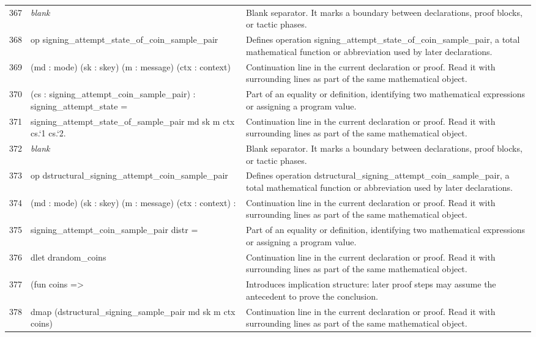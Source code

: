 \documentclass[10pt]{article}
\begin{document}
\begin{longtable}{r L{0.53\textwidth} L{0.37\textwidth}}
367 & {\ttfamily\scriptsize \emph{blank}} & Blank separator.  It marks a boundary between declarations, proof blocks, or tactic phases. \\
368 & {\ttfamily\scriptsize op signing\_attempt\_state\_of\_coin\_sample\_pair} & Defines operation signing\_attempt\_state\_of\_coin\_sample\_pair, a total mathematical function or abbreviation used by later declarations. \\
369 & {\ttfamily\scriptsize    (md : mode) (sk : skey) (m : message) (ctx : context)} & Continuation line in the current declaration or proof.  Read it with surrounding lines as part of the same mathematical object. \\
370 & {\ttfamily\scriptsize    (cs : signing\_attempt\_coin\_sample\_pair) : signing\_attempt\_state =} & Part of an equality or definition, identifying two mathematical expressions or assigning a program value. \\
371 & {\ttfamily\scriptsize   signing\_attempt\_state\_of\_sample\_pair md sk m ctx cs.`1 cs.`2.} & Continuation line in the current declaration or proof.  Read it with surrounding lines as part of the same mathematical object. \\
372 & {\ttfamily\scriptsize \emph{blank}} & Blank separator.  It marks a boundary between declarations, proof blocks, or tactic phases. \\
373 & {\ttfamily\scriptsize op dstructural\_signing\_attempt\_coin\_sample\_pair} & Defines operation dstructural\_signing\_attempt\_coin\_sample\_pair, a total mathematical function or abbreviation used by later declarations. \\
374 & {\ttfamily\scriptsize    (md : mode) (sk : skey) (m : message) (ctx : context) :} & Continuation line in the current declaration or proof.  Read it with surrounding lines as part of the same mathematical object. \\
375 & {\ttfamily\scriptsize    signing\_attempt\_coin\_sample\_pair distr =} & Part of an equality or definition, identifying two mathematical expressions or assigning a program value. \\
376 & {\ttfamily\scriptsize   dlet drandom\_coins} & Continuation line in the current declaration or proof.  Read it with surrounding lines as part of the same mathematical object. \\
377 & {\ttfamily\scriptsize     (fun coins =>} & Introduces implication structure: later proof steps may assume the antecedent to prove the conclusion. \\
378 & {\ttfamily\scriptsize       dmap (dstructural\_signing\_sample\_pair md sk m ctx coins)} & Continuation line in the current declaration or proof.  Read it with surrounding lines as part of the same mathematical object. \\

\end{longtable}
\end{document}
